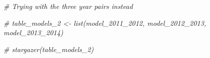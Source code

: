 \documentclass[
]{article}
\newenvironment{Shaded}{\begin{snugshade}}{\end{snugshade}}
\newcommand{\CommentTok}[1]{\textcolor[rgb]{0.56,0.35,0.01}{\textit{#1}}}
\begin{document}
\begin{Shaded}
\begin{Highlighting}[]
\CommentTok{\# Trying with the three year pairs instead}

\CommentTok{\# table\_models\_2 \textless{}{-} list(model\_2011\_2012, model\_2012\_2013, model\_2013\_2014)}


\CommentTok{\# stargazer(table\_models\_2)}
\end{Highlighting}
\end{Shaded}
\end{document}
